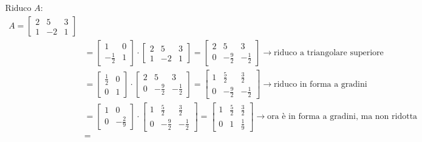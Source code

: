 \documentclass[italian]{article}
\begin{document}
\begin{gather*}
	\text{Riduco $A$:}\\
	\begin{split}
		A =
		\begin{bmatrix}
			2 & 5 & 3 \\
			1 & -2 & 1	
		\end{bmatrix} & \\
		&= 
		\begin{bmatrix}
			1 & 0 \\[2mm]
			-\frac{1}{2} & 1 
		\end{bmatrix}
		\cdot
		\begin{bmatrix}
			2 & 5 & 3 \\
			1 & -2 & 1	
		\end{bmatrix}
		=
		\begin{bmatrix}
			2 & 5 & 3 \\[2mm]
			0 & -\frac{9}{2} & -\frac{1}{2} 
		\end{bmatrix} \to \text{riduco a triangolare superiore}\\[2mm]
		&=
		\begin{bmatrix}
			\frac{1}{2} & 0 \\[2mm]
			0 & 1
		\end{bmatrix}
		\cdot
		\begin{bmatrix}
			2 & 5 & 3 \\[2mm]
			0 & -\frac{9}{2} & -\frac{1}{2} 
		\end{bmatrix}
		=
		\begin{bmatrix}
			1 & \frac{5}{2} & \frac{3}{2} \\[2mm]
			0 & -\frac{9}{2} & -\frac{1}{2} 
		\end{bmatrix} \to \text{riduco in forma a gradini}\\[2mm]
		&=
		\begin{bmatrix}
			1 & 0 \\[2mm]
			0 & -\frac{2}{9} 
		\end{bmatrix}
		\cdot
		\begin{bmatrix}
			1 & \frac{5}{2} & \frac{3}{2} \\[2mm]
			0 & -\frac{9}{2} & -\frac{1}{2} 
		\end{bmatrix}
		=
		\begin{bmatrix}
			1 & \frac{5}{2} & \frac{3}{2} \\[2mm]
			0 & 1 & \frac{1}{9} 
		\end{bmatrix} \to \text{ora è in forma a gradini, ma non ridotta}\\[2mm]
		&=

\end{split}
\end{gather*}
\end{document}
